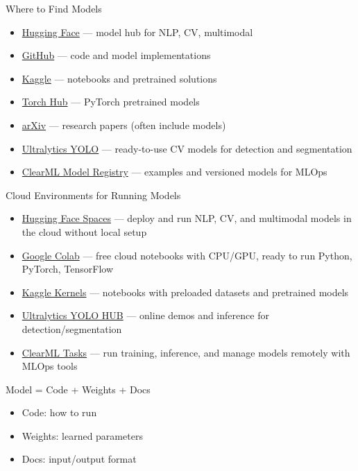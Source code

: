 \documentclass[aspectratio=169]{beamer}
\begin{document}
\begin{frame}[t]{Where to Find Models}
\begin{itemize}
\item \href{https://huggingface.co/models}{Hugging Face} — model hub for NLP, CV, multimodal
\item \href{https://github.com}{GitHub} — code and model implementations
\item \href{https://www.kaggle.com}{Kaggle} — notebooks and pretrained solutions
\item \href{https://pytorch.org/hub/}{Torch Hub} — PyTorch pretrained models
\item \href{https://arxiv.org}{arXiv} — research papers (often include models)
\item \href{https://ultralytics.com/}{Ultralytics YOLO} — ready-to-use CV models for detection and segmentation
\item \href{https://clear.ml/docs/latest/docs/model\_registry/}{ClearML Model Registry} — examples and versioned models for MLOps
\end{itemize}
\end{frame}

\begin{frame}[t]{Cloud Environments for Running Models}
\begin{itemize}
\item \href{https://huggingface.co/spaces}{Hugging Face Spaces} — deploy and run NLP, CV, and multimodal models in the cloud without local setup
\item \href{https://colab.research.google.com}{Google Colab} — free cloud notebooks with CPU/GPU, ready to run Python, PyTorch, TensorFlow
\item \href{https://www.kaggle.com/kernels}{Kaggle Kernels} — notebooks with preloaded datasets and pretrained models
\item \href{https://ultralytics.com/yolov8}{Ultralytics YOLO HUB} — online demos and inference for detection/segmentation
\item \href{https://clear.ml/docs/latest/docs/guides/clearml-task/clearml_task_tutorial/}{ClearML Tasks} — run training, inference, and manage models remotely with MLOps tools
\end{itemize}
\end{frame}

\begin{frame}[t]{Model = Code + Weights + Docs}
\begin{itemize}
\item Code: how to run
\item Weights: learned parameters
\item Docs: input/output format
\end{itemize}
\end{frame}
\end{document}
